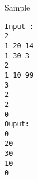 Sample
\begin{verbatim}
Input :
2 
1 20 14 
1 30 3 
2 
1 10 99 
3 
2 
2 
0 
Ouput: 
0 
20 
30 
10 
0 
\end{verbatim}